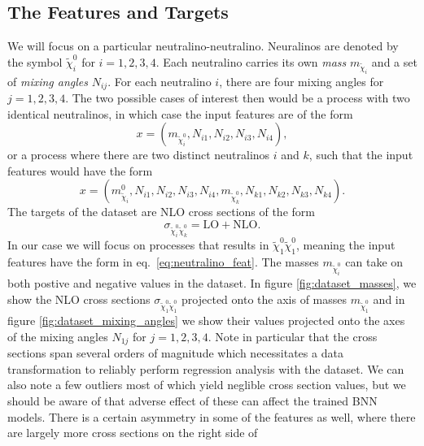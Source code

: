 \subsection{The Features and Targets}
We will focus on a particular neutralino-neutralino. Neuralinos are denoted by the symbol $\tilde{\chi}_i^0$ for $i = 1, 2, 3, 4$.
Each neutralino carries its own \textit{mass} $m_{\tilde{\chi}_i}$ and a set of \textit{mixing angles} $N_{ij}$. For each neutralino $i$, there are four mixing angles for $j = 1, 2, 3, 4$. The two possible cases of interest then would be a process with two identical neutralinos, in which case the input features are of the form
\begin{equation}\label{eq:neutralino_feat}
    x = (m_{\tilde{\chi}_i^0}, N_{i1}, N_{i2}, N_{i3}, N_{i4}),
\end{equation} 
or a process where there are two distinct neutralinos $i$ and $k$, such that the input features would have the form
\begin{equation}
    x = (m_{\tilde{\chi}_i}^0, N_{i1}, N_{i2}, N_{i3}, N_{i4}, m_{\tilde{\chi}_k^0},  N_{k1}, N_{k2}, N_{k3}, N_{k4}).
\end{equation}
The targets of the dataset are NLO cross sections of the form
\begin{equation}
    \sigma_{\tilde{\chi}_i^0 \tilde{\chi}_k^0} = \text{LO} + \text{NLO}.
\end{equation}
In our case we will focus on processes that results in $\tilde{\chi}_1^0\tilde{\chi}_1^0$, meaning the input features have the form in eq.~\eqref{eq:neutralino_feat}. The masses $m_{\tilde{\chi}_i^0}$ can take on both postive and negative values in the dataset. In figure \ref{fig:dataset_masses}, we show the NLO cross sections $\sigma_{\tilde{\chi}_1^0 \tilde{\chi}_1^0}$ projected onto the axis of masses $m_{\tilde{\chi}_1^0}$ and in figure \ref{fig:dataset_mixing_angles} we show their values projected onto the axes of the mixing angles $N_{1j}$ for $j=1,2,3,4$. 
Note in particular that the cross sections span several orders of magnitude which necessitates a data transformation to reliably perform regression analysis with the dataset. We can also note a few outliers most of which yield neglible cross section values, but we should be aware of that adverse effect of these can affect the trained BNN models. There is a certain asymmetry in some of the features as well, where there are largely more cross sections on the right side of 


